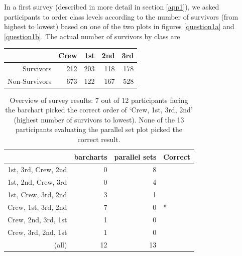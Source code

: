 In a first survey (described in more detail in section \ref{app1}), we asked participants to order class  levels according to the number of survivors (from highest to lowest) based on one of the two plots in figures \ref{question1a} and \ref{question1b}. The actual number of survivors by class are
%
\begin{center}
\begin{tabular}{rrrrr}
& Crew & 1st & 2nd & 3rd \\ \hline
Survivors & 212 & 203 & 118 & 178\\
Non-Survivors & 673 & 122 & 167 &  528  
\end{tabular}
\end{center}


\begin{table}[ht]
\begin{center}
\begin{tabular}{rrrl}
  \hline
 & barcharts & parallel sets & Correct \\ 
  \hline
 1st, 3rd, Crew,  2nd & 0 & 8 &  \\ 
  1st, 2nd, Crew, 3rd & 0 & 4 &  \\ 
 1st, Crew, 3rd, 2nd & 3 & 1 &  \\ 
  Crew, 1st, 3rd, 2nd & 7 & 0 & * \\ 
  Crew, 2nd, 3rd, 1st & 1 & 0 &  \\ 
  Crew, 3rd, 2nd, 1st & 1 & 0 &  \\ 
   \hline
(all) & 12 & 13 &  \\ 
   \hline
\end{tabular}
\caption{Overview of survey results: 7 out of 12 participants facing the barchart picked the correct order of `Crew, 1st, 3rd, 2nd' (highest number of survivors to lowest). None of the 13 participants evaluating the parallel set plot picked the correct result. }
\label{tab:results}
\end{center}
\end{table}


%
%
%


